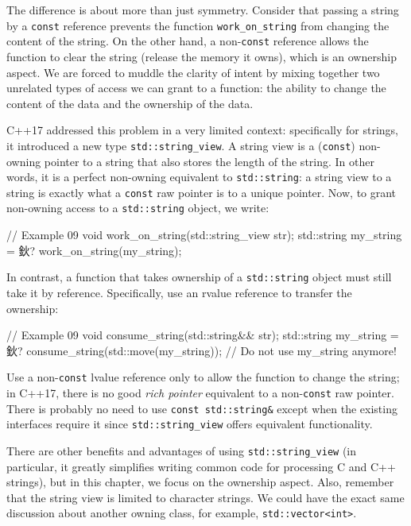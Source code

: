 The difference is about more than just symmetry. Consider that passing a string by a \texttt{const} reference prevents the function \texttt{work\_on\_string} from changing the content of the string. On the other hand, a non-\texttt{const} reference allows the function to clear the string (release the memory it owns), which is an ownership aspect. We are forced to muddle the clarity of intent by mixing together two unrelated types of access we can grant to a function: the ability to change the content of the data and the ownership of the data.

C++17 addressed this problem in a very limited context: specifically for strings, it introduced a new type \texttt{std::string\_view}. A string view is a (\texttt{const}) non-owning pointer to a string that also stores the length of the string. In other words, it is a perfect non-owning equivalent to \texttt{std::string}: a string view to a string is exactly what a \texttt{const} raw pointer is to a unique pointer. Now, to grant non-owning access to a \texttt{std::string} object, we write:

\begin{code}
// Example 09
void work_on_string(std::string_view str);
std::string my_string = 鈥?
work_on_string(my_string);
\end{code}

In contrast, a function that takes ownership of a \texttt{std::string} object must still take it by reference. Specifically, use an rvalue reference to transfer the ownership:

\begin{code}
// Example 09
void consume_string(std::string&& str);
std::string my_string = 鈥?
consume_string(std::move(my_string));
// Do not use my_string anymore!
\end{code}

Use a non-\texttt{const} lvalue reference only to allow the function to change the string; in C++17, there is no good \emph{rich pointer} equivalent to a non-\texttt{const} raw pointer. There is probably no need to use \texttt{const\ std::string\&} except when the existing interfaces require it since \texttt{std::string\_view} offers equivalent functionality.

There are other benefits and advantages of using \texttt{std::string\_view} (in particular, it greatly simplifies writing common code for processing C and C++ strings), but in this chapter, we focus on the ownership aspect. Also, remember that the string view is limited to character strings. We could have the exact same discussion about another owning class, for example, \texttt{std::vector\textless{}int\textgreater{}}.

